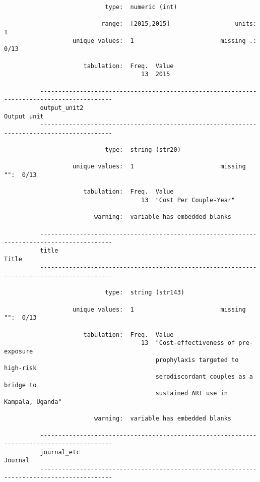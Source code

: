 \documentclass{article}
\begin{document}
\begin{verbatim}
                            type:  numeric (int)
          
                           range:  [2015,2015]                  units:  1
                   unique values:  1                        missing .:  0/13
          
                      tabulation:  Freq.  Value
                                      13  2015
          
          ------------------------------------------------------------------------------------------
          output_unit2                                                                   Output unit
          ------------------------------------------------------------------------------------------
          
                            type:  string (str20)
          
                   unique values:  1                        missing "":  0/13
          
                      tabulation:  Freq.  Value
                                      13  "Cost Per Couple-Year"
          
                         warning:  variable has embedded blanks
          
          ------------------------------------------------------------------------------------------
          title                                                                                Title
          ------------------------------------------------------------------------------------------
          
                            type:  string (str143)
          
                   unique values:  1                        missing "":  0/13
          
                      tabulation:  Freq.  Value
                                      13  "Cost-effectiveness of pre-exposure
                                          prophylaxis targeted to high-risk
                                          serodiscordant couples as a bridge to
                                          sustained ART use in Kampala, Uganda"
          
                         warning:  variable has embedded blanks
          
          ------------------------------------------------------------------------------------------
          journal_etc                                                                        Journal
          ------------------------------------------------------------------------------------------
          

\end{verbatim}
\end{document}
